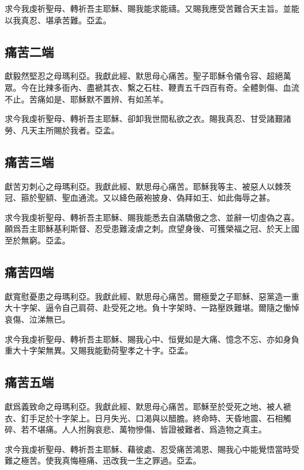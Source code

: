 求{\cspace}今我虔祈聖母、轉祈吾主耶穌、賜我能求能禱。又賜我應受苦難合天主旨。並能以我真忍、堪承苦難。{\cspace}亞孟。

\subsection{痛苦二端}
獻{\cspace}毅然堅忍之母瑪利亞。我獻此經、默思母心痛苦。聖子耶穌令儀令容、超絕萬眾。今在比辣多衙內、盡褫其衣、繫之石柱、鞭責五千四百有奇。全體剝傷、血流不止。苦痛如是、耶穌默不置辨、有如羔羊。

求{\cspace}今我虔祈聖母、轉祈吾主耶穌、卻卸我世間私欲之衣。賜我真忍、甘受諸艱諸勞、凡天主所賜於我者。{\cspace}亞孟。

\subsection{痛苦三端}
獻{\cspace}苦刃刺心之母瑪利亞。我獻此經、默思母心痛苦。耶穌我等主、被惡人以棘茨冠、箍於聖額、聖血通流。又以絳色蔽袍披身、偽拜如王、如此侮辱之甚。

求{\cspace}今我虔祈聖母、轉祈吾主耶穌、賜我能悉去自滿驕傲之念、並辭一切虛偽之喜。願爲吾主耶穌基利斯督、忍受患難淩虐之刺。庶望身後、可獲榮福之冠、於天上國至於無窮。{\cspace}亞孟。

\subsection{痛苦四端}
獻{\cspace}寬慰憂患之母瑪利亞。我獻此經、默思母心痛苦。爾極愛之子耶穌、惡黨造一重大十字架、逼令自己肩荷、赴受死之地。負十字架時、一路壓跌難堪。爾隨之慟悼哀傷、泣涕無已。

求{\cspace}今我虔祈聖母、轉祈吾主耶穌、賜我心中、恒覺如是大痛、憶念不忘、亦如身負重大十字架無異。又賜我能勤荷聖孝之十字。{\cspace}亞孟。

\subsection{痛苦五端}
獻{\cspace}爲義致命之母瑪利亞。我獻此經、默思母心痛苦。耶穌至於受死之地、被人褫衣、釘手足於十字架上。日月失光、口渴與以醋膽。終命時、天昏地震、石相觸碎、若不堪痛。人人拊胸哀悲、萬物慘傷、皆證被難者、爲造物之真主。

求{\cspace}今我虔祈聖母、轉祈吾主耶穌、藉彼處、忍受痛苦鴻恩、賜我心中能覺悟當時受難之極苦。使我真悔極痛、迅改我一生之罪過。{\cspace}亞孟。


